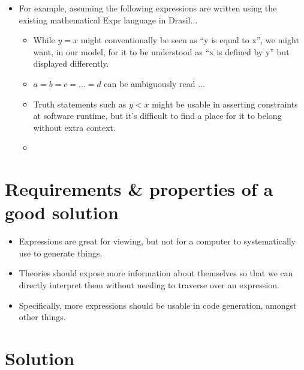 \begin{itemize}
	\item For example, assuming the following expressions are written using the
	      existing mathematical Expr language in Drasil...
	      \begin{itemize}

		      \item While \(y = x\) might conventionally be seen as ``y is equal
		            to x'', we might want, in our model, for it to be understood
		            as ``x is defined by y'' but displayed differently.

		      \item \(a = b = c = ... = d\) can be ambiguously read ...

		      \item Truth statements such as \(y < x\) might be usable in
		            asserting constraints at software runtime, but it's
		            difficult to find a place for it to belong without extra
		            context.

		      \item {}

	      \end{itemize}

\end{itemize}

\section{Requirements \& properties of a good solution}

\begin{itemize}

	\item Expressions are great for viewing, but not for a computer to
	      systematically use to generate things.

	\item Theories should expose more information about themselves so that we
	      can directly interpret them without needing to traverse over an
	      expression.

	\item Specifically, more expressions should be usable in code generation,
	      amongst other things.

\end{itemize}

\section{Solution}

